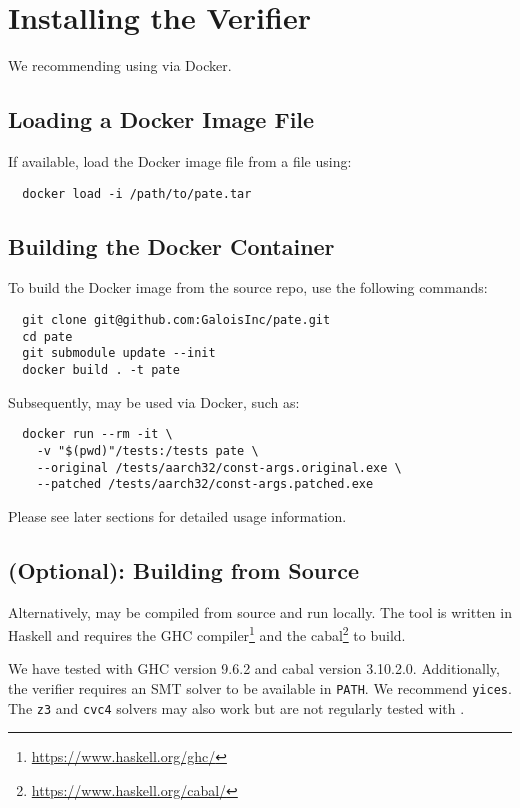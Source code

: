 \section{Installing the \pate{} Verifier}
\label{sec:build-pate-verif}

We recommending using \pate{} via Docker.

\subsection{Loading a Docker Image File}

If available, load the Docker image file from a file using:
\begin{verbatim}
  docker load -i /path/to/pate.tar
\end{verbatim}

\subsection{Building the Docker Container}

To build the Docker image from the \pate{} source repo, use the following commands:

\begin{verbatim}
  git clone git@github.com:GaloisInc/pate.git
  cd pate
  git submodule update --init
  docker build . -t pate
\end{verbatim}

Subsequently, \pate{} may be used via Docker, such as:

\begin{verbatim}
  docker run --rm -it \
    -v "$(pwd)"/tests:/tests pate \
    --original /tests/aarch32/const-args.original.exe \
    --patched /tests/aarch32/const-args.patched.exe
\end{verbatim}

Please see later sections for detailed usage information.

\subsection{(Optional): Building from Source}

Alternatively, \pate{} may be compiled from source and run locally.
The \pate{} tool is written in Haskell and requires the GHC compiler\footnote{\url{https://www.haskell.org/ghc/}} and the cabal\footnote{\url{https://www.haskell.org/cabal/}} to build.

We have tested with GHC version 9.6.2 and cabal version 3.10.2.0.
Additionally, the verifier requires an SMT solver to be available in \texttt{PATH}.
We recommend \texttt{yices}.
The \texttt{z3} and \texttt{cvc4} solvers may also work but are not regularly tested with \pate{}.

